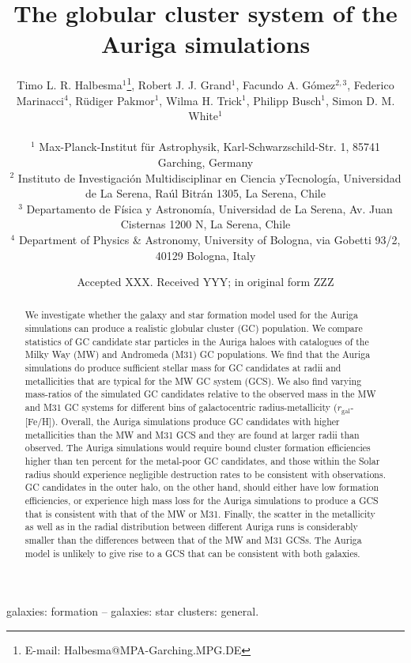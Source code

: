 \documentclass[a4paper,fleqn,usenatbib]{mnras}
\title[Auriga GCS]{The globular cluster system of the Auriga simulations}
\author[T. L. R. Halbesma et al.]{\parbox[t]{\textwidth}{
    Timo L. R. Halbesma$^{1}$\thanks{E-mail: Halbesma@MPA-Garching.MPG.DE},
    Robert J. J. Grand$^{1}$,
    Facundo A. G\'{o}mez$^{2,3}$,
    Federico Marinacci$^{4}$,
    R\"{u}diger Pakmor$^{1}$,
    Wilma H. Trick$^{1}$,
    Philipp Busch$^{1}$,
    Simon D. M. White$^{1}$
} \vspace{10pt} \\
$^{1}$ Max-Planck-Institut f\"ur Astrophysik, Karl-Schwarzschild-Str. 1,
    85741 Garching, Germany \\
$^{2}$ Instituto de Investigaci\'{o}n Multidisciplinar en Ciencia yTecnolog\'{i}a,
    Universidad de La Serena, Ra\'{u}l Bitr\'{a}n 1305, La Serena, Chile \\
$^{3}$ Departamento de F\'{i}sica y Astronom\'{i}a, Universidad de La Serena, Av.
    Juan Cisternas 1200 N, La Serena, Chile \\
$^{4}$ Department of Physics \& Astronomy, University of Bologna, via Gobetti 93/2, 40129 Bologna, Italy \\
}
\date{Accepted XXX. Received YYY; in original form ZZZ}
\begin{document}
\label{firstpage}
\pagerange{\pageref{firstpage}--\pageref{lastpage}}
\maketitle

\begin{abstract}
We investigate whether the galaxy and star formation model used for the Auriga
simulations can produce a realistic globular cluster (GC) population. 
We compare statistics of GC 
candidate star particles in the Auriga haloes with catalogues of the Milky Way 
(MW) and Andromeda (M31) GC populations. We find that the Auriga simulations do 
produce sufficient stellar mass for GC candidates at radii and metallicities that 
are typical for the MW GC system (GCS). We also find varying mass-ratios of the
simulated GC candidates relative to the observed mass in the MW and M31 GC systems
for different bins of galactocentric radius-metallicity ($r_{\text{gal}}$-[Fe/H]).
Overall, the Auriga 
simulations produce GC candidates with higher metallicities than the MW and M31 
GCS and they are found at larger radii than observed. The Auriga simulations would
require bound cluster formation efficiencies higher than ten percent for the 
metal-poor GC candidates, and those within the Solar radius should experience 
negligible destruction rates to be consistent with observations.
GC candidates in the outer halo, on the other hand, should either have low formation
efficiencies, or experience high mass loss for the Auriga simulations to produce a
GCS that is consistent with that of the MW or M31. Finally, the scatter in the 
metallicity as well as in the radial distribution between different Auriga runs 
is considerably smaller than the differences between that of the MW and M31 GCSs. 
The Auriga model is unlikely to give rise to a GCS that can be consistent with
both galaxies.
\end{abstract}

\begin{keywords}
galaxies: formation -- galaxies: star clusters: general.
\end{keywords}


\end{document}
